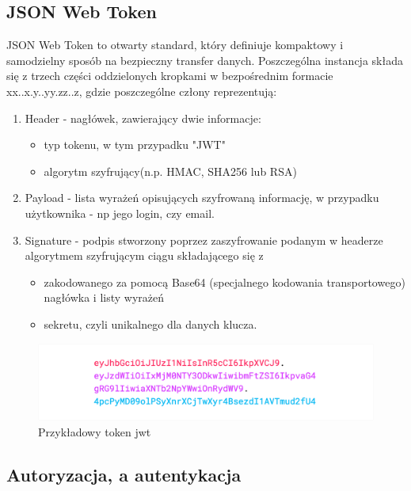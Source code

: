 \subsection{JSON Web Token}

JSON Web Token to otwarty standard, który definiuje kompaktowy i samodzielny sposób na bezpieczny transfer danych. Poszczególna instancja składa się z trzech części oddzielonych kropkami w bezpośrednim formacie xx..x.y..yy.zz..z, gdzie poszczególne człony reprezentują: \cite{jwt}
\begin{enumerate}%
	\item Header - nagłówek, zawierający dwie informacje:
		\begin{itemize}
			\item typ tokenu, w tym przypadku "JWT"
			\item algorytm szyfrujący(n.p. HMAC, SHA256 lub RSA)
		\end{itemize}

	\item Payload - lista wyrażeń opisujących szyfrowaną informację, w przypadku użytkownika - np jego login, czy email.
	
	\item Signature - podpis stworzony poprzez zaszyfrowanie podanym w headerze algorytmem szyfrującym ciągu składającego się z
	\begin{itemize}
		\item zakodowanego za pomocą Base64 (specjalnego kodowania transportowego) nagłówka i listy wyrażeń
		\item sekretu, czyli unikalnego dla danych klucza.
	\end{itemize}
	\end{enumerate}

	\begin{figure}[H]
		\centering
		\includegraphics[width=\linewidth]{json-token.png}
		\caption{Przykładowy token jwt \cite{jwt}}
	\end{figure}

\subsection{Autoryzacja, a autentykacja}

